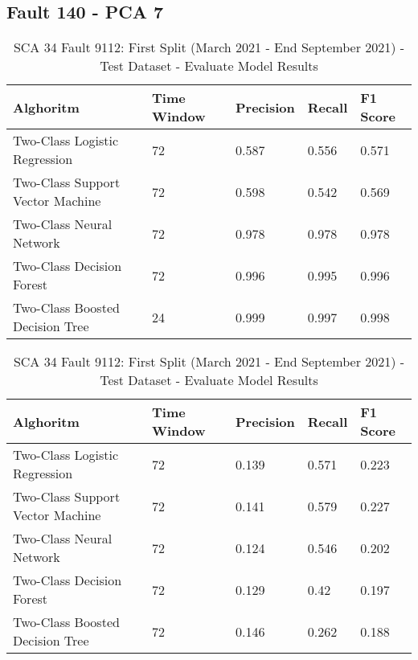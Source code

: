 \subsection{Fault 140 - PCA 7}

\begin{table}[!ht]
    \centering
    \begin{tabular}{|l|l|l|l|l|}
    \hline
        Alghoritm & Time Window & Precision & Recall & F1 Score \\ \hline
        Two-Class Logistic Regression & 72 & 0.587 & 0.556 & 0.571 \\ \hline
        Two-Class Support Vector Machine & 72 & 0.598 & 0.542 & 0.569 \\ \hline
        Two-Class Neural Network & 72 & 0.978 & 0.978 & 0.978 \\ \hline
        Two-Class Decision Forest & 72 & 0.996 & 0.995 & 0.996 \\ \hline
        Two-Class Boosted Decision Tree & 24 & 0.999 & 0.997 & 0.998 \\ \hline
    \end{tabular}
    \caption{SCA 34 Fault 9112: First Split (March 2021 - End September 2021) - Test Dataset - Evaluate Model Results}
    \label{9112_SCA34_1st}
\end{table}

\begin{table}[!ht]
    \centering
    \begin{tabular}{|l|l|l|l|l|}
    \hline
        Alghoritm & Time Window & Precision & Recall & F1 Score \\ \hline
        Two-Class Logistic Regression & 72 & 0.139 & 0.571 & 0.223 \\ \hline
        Two-Class Support Vector Machine & 72 & 0.141 & 0.579 & 0.227 \\ \hline
        Two-Class Neural Network & 72 & 0.124 & 0.546 & 0.202 \\ \hline
        Two-Class Decision Forest & 72 & 0.129 & 0.42 & 0.197 \\ \hline
        Two-Class Boosted Decision Tree & 72 & 0.146 & 0.262 & 0.188 \\ \hline
    \end{tabular}
    \caption{SCA 34 Fault 9112: First Split (March 2021 - End September 2021) - Test Dataset - Evaluate Model Results}
    \label{9112_SCA34_1st}
\end{table}

